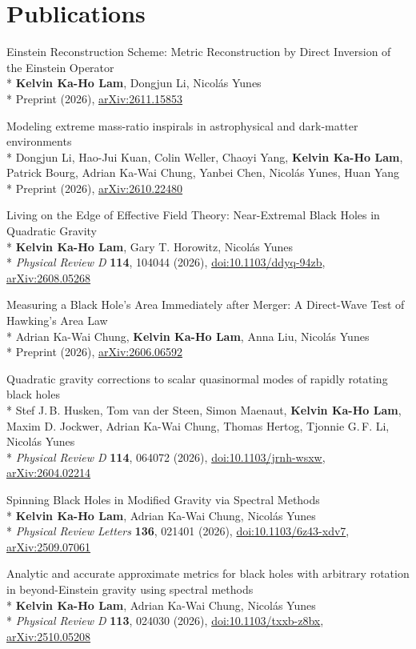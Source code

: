 \documentclass[11pt]{article}
\newcommand{\pub}[3]{\item #1\\* #2\\* #3}
\newcommand{\me}{\textbf{Kelvin Ka-Ho Lam}}
\newcommand{\arxiv}[1]{\href{https://arxiv.org/abs/#1}{arXiv:#1}}
\newcommand{\doi}[1]{\href{https://doi.org/#1}{doi:#1}}
\begin{document}
\section*{Publications}
{\raggedright{}
\newcommand{\npubs}{11}
\makeatletter
\newcommand{\revnum}[1]{\expandafter\@revnum\csname c@#1\endcsname}
\newcommand{\@revnum}[1]{\number\numexpr\npubs+1-#1\relax}
\makeatother
{}
\begin{enumerate}[leftmargin=2.4em, itemsep=2pt, label={[\revnum*]}]

\pub{Einstein Reconstruction Scheme: Metric Reconstruction by Direct Inversion of the Einstein Operator}
    {\me, Dongjun Li, Nicolás Yunes}
    {Preprint (2026), \arxiv{2611.15853}}

\pub{Modeling extreme mass-ratio inspirals in astrophysical and dark-matter environments}
    {Dongjun Li, Hao-Jui Kuan, Colin Weller, Chaoyi Yang, \me, Patrick Bourg, Adrian Ka-Wai Chung, Yanbei Chen, Nicolás Yunes, Huan Yang}
    {Preprint (2026), \arxiv{2610.22480}}

\pub{Living on the Edge of Effective Field Theory: Near-Extremal Black Holes in Quadratic Gravity}
    {\me, Gary T. Horowitz, Nicolás Yunes}
    {\textit{Physical Review D} \textbf{114}, 104044 (2026), \doi{10.1103/ddyq-94zb}, \arxiv{2608.05268}}

\pub{Measuring a Black Hole's Area Immediately after Merger: A Direct-Wave Test of Hawking's Area Law}
    {Adrian Ka-Wai Chung, \me, Anna Liu, Nicolás Yunes}
    {Preprint (2026), \arxiv{2606.06592}}

\pub{Quadratic gravity corrections to scalar quasinormal modes of rapidly rotating black holes}
    {Stef J.\,B. Husken, Tom van der Steen, Simon Maenaut, \me, Maxim D. Jockwer, Adrian Ka-Wai Chung, Thomas Hertog, Tjonnie G.\,F. Li, Nicolás Yunes}
    {\textit{Physical Review D} \textbf{114}, 064072 (2026), \doi{10.1103/jrnh-wsxw}, \arxiv{2604.02214}}

\pub{Spinning Black Holes in Modified Gravity via Spectral Methods}
    {\me, Adrian Ka-Wai Chung, Nicolás Yunes}
    {\textit{Physical Review Letters} \textbf{136}, 021401 (2026), \doi{10.1103/6z43-xdv7}, \arxiv{2509.07061}}

\pub{Analytic and accurate approximate metrics for black holes with arbitrary rotation in beyond-Einstein gravity using spectral methods}
    {\me, Adrian Ka-Wai Chung, Nicolás Yunes}
    {\textit{Physical Review D} \textbf{113}, 024030 (2026), \doi{10.1103/txxb-z8bx}, \arxiv{2510.05208}}


\end{enumerate}}
\end{document}
